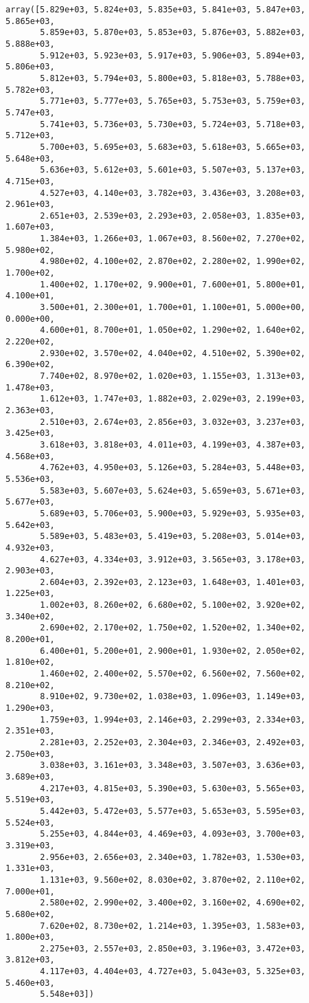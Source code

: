 \documentclass[11pt]{article}
\begin{document}
    
    
    \begin{verbatim}
array([5.829e+03, 5.824e+03, 5.835e+03, 5.841e+03, 5.847e+03, 5.865e+03,
       5.859e+03, 5.870e+03, 5.853e+03, 5.876e+03, 5.882e+03, 5.888e+03,
       5.912e+03, 5.923e+03, 5.917e+03, 5.906e+03, 5.894e+03, 5.806e+03,
       5.812e+03, 5.794e+03, 5.800e+03, 5.818e+03, 5.788e+03, 5.782e+03,
       5.771e+03, 5.777e+03, 5.765e+03, 5.753e+03, 5.759e+03, 5.747e+03,
       5.741e+03, 5.736e+03, 5.730e+03, 5.724e+03, 5.718e+03, 5.712e+03,
       5.700e+03, 5.695e+03, 5.683e+03, 5.618e+03, 5.665e+03, 5.648e+03,
       5.636e+03, 5.612e+03, 5.601e+03, 5.507e+03, 5.137e+03, 4.715e+03,
       4.527e+03, 4.140e+03, 3.782e+03, 3.436e+03, 3.208e+03, 2.961e+03,
       2.651e+03, 2.539e+03, 2.293e+03, 2.058e+03, 1.835e+03, 1.607e+03,
       1.384e+03, 1.266e+03, 1.067e+03, 8.560e+02, 7.270e+02, 5.980e+02,
       4.980e+02, 4.100e+02, 2.870e+02, 2.280e+02, 1.990e+02, 1.700e+02,
       1.400e+02, 1.170e+02, 9.900e+01, 7.600e+01, 5.800e+01, 4.100e+01,
       3.500e+01, 2.300e+01, 1.700e+01, 1.100e+01, 5.000e+00, 0.000e+00,
       4.600e+01, 8.700e+01, 1.050e+02, 1.290e+02, 1.640e+02, 2.220e+02,
       2.930e+02, 3.570e+02, 4.040e+02, 4.510e+02, 5.390e+02, 6.390e+02,
       7.740e+02, 8.970e+02, 1.020e+03, 1.155e+03, 1.313e+03, 1.478e+03,
       1.612e+03, 1.747e+03, 1.882e+03, 2.029e+03, 2.199e+03, 2.363e+03,
       2.510e+03, 2.674e+03, 2.856e+03, 3.032e+03, 3.237e+03, 3.425e+03,
       3.618e+03, 3.818e+03, 4.011e+03, 4.199e+03, 4.387e+03, 4.568e+03,
       4.762e+03, 4.950e+03, 5.126e+03, 5.284e+03, 5.448e+03, 5.536e+03,
       5.583e+03, 5.607e+03, 5.624e+03, 5.659e+03, 5.671e+03, 5.677e+03,
       5.689e+03, 5.706e+03, 5.900e+03, 5.929e+03, 5.935e+03, 5.642e+03,
       5.589e+03, 5.483e+03, 5.419e+03, 5.208e+03, 5.014e+03, 4.932e+03,
       4.627e+03, 4.334e+03, 3.912e+03, 3.565e+03, 3.178e+03, 2.903e+03,
       2.604e+03, 2.392e+03, 2.123e+03, 1.648e+03, 1.401e+03, 1.225e+03,
       1.002e+03, 8.260e+02, 6.680e+02, 5.100e+02, 3.920e+02, 3.340e+02,
       2.690e+02, 2.170e+02, 1.750e+02, 1.520e+02, 1.340e+02, 8.200e+01,
       6.400e+01, 5.200e+01, 2.900e+01, 1.930e+02, 2.050e+02, 1.810e+02,
       1.460e+02, 2.400e+02, 5.570e+02, 6.560e+02, 7.560e+02, 8.210e+02,
       8.910e+02, 9.730e+02, 1.038e+03, 1.096e+03, 1.149e+03, 1.290e+03,
       1.759e+03, 1.994e+03, 2.146e+03, 2.299e+03, 2.334e+03, 2.351e+03,
       2.281e+03, 2.252e+03, 2.304e+03, 2.346e+03, 2.492e+03, 2.750e+03,
       3.038e+03, 3.161e+03, 3.348e+03, 3.507e+03, 3.636e+03, 3.689e+03,
       4.217e+03, 4.815e+03, 5.390e+03, 5.630e+03, 5.565e+03, 5.519e+03,
       5.442e+03, 5.472e+03, 5.577e+03, 5.653e+03, 5.595e+03, 5.524e+03,
       5.255e+03, 4.844e+03, 4.469e+03, 4.093e+03, 3.700e+03, 3.319e+03,
       2.956e+03, 2.656e+03, 2.340e+03, 1.782e+03, 1.530e+03, 1.331e+03,
       1.131e+03, 9.560e+02, 8.030e+02, 3.870e+02, 2.110e+02, 7.000e+01,
       2.580e+02, 2.990e+02, 3.400e+02, 3.160e+02, 4.690e+02, 5.680e+02,
       7.620e+02, 8.730e+02, 1.214e+03, 1.395e+03, 1.583e+03, 1.800e+03,
       2.275e+03, 2.557e+03, 2.850e+03, 3.196e+03, 3.472e+03, 3.812e+03,
       4.117e+03, 4.404e+03, 4.727e+03, 5.043e+03, 5.325e+03, 5.460e+03,
       5.548e+03])
    \end{verbatim}
\end{document}
